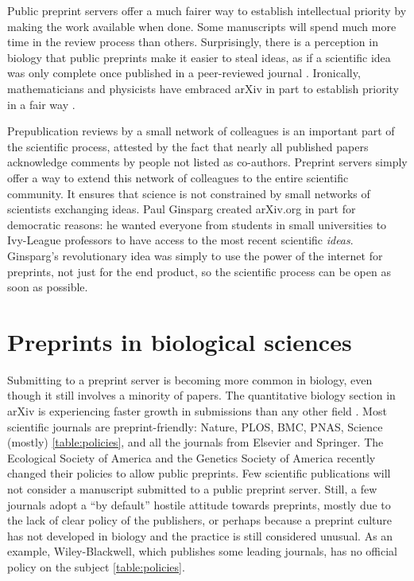 \documentclass[letterpaper,twocolumn,superscriptaddress,showkeys,longbibliography]{revtex4-1}
\begin{document}
Public preprint servers offer a much fairer way to establish intellectual
priority by making the work available when done. Some manuscripts will spend
much more time in the review process than others. Surprisingly, there is a
perception in biology that public preprints make it easier to steal ideas, as if
a scientific idea was only complete once published in a peer-reviewed journal
\cite{gin11}. Ironically, mathematicians and physicists have embraced arXiv in
part to establish priority in a fair way \cite{gin11,cal12}.

Prepublication reviews by a small network of colleagues is an important part of
the scientific process, attested by the fact that nearly all published papers
acknowledge comments by people not listed as co-authors.  Preprint servers
simply offer a way to extend this network of colleagues to the entire scientific
community. It ensures that science is not constrained by small networks of
scientists exchanging ideas.  Paul Ginsparg created arXiv.org in part for
democratic reasons: he wanted everyone from students in small universities to
Ivy-League professors to have access to the most recent scientific \emph{ideas}.
Ginsparg's revolutionary idea was simply to use the power of the internet for
preprints, not just for the end product, so the scientific process can be open
as soon as possible.

\section{Preprints in biological sciences}

Submitting to a preprint server is becoming more common in biology, even though
it still involves a minority of papers. The quantitative biology section in
arXiv is experiencing faster growth in submissions than any other field
\cite{cal12}. Most scientific journals are preprint-friendly: Nature, PLOS, BMC,
PNAS, Science (mostly) \ref{table:policies}, and all the journals from Elsevier %
and Springer.  The Ecological Society of America and the Genetics Society of
America recently changed their policies to allow public preprints.  Few
scientific publications will not consider a manuscript submitted to a public
preprint server.  Still, a few journals adopt a ``by default'' hostile attitude
towards preprints, mostly due to the lack of clear policy of the publishers, or
perhaps because a preprint culture has not developed in biology and the practice
is still considered unusual. As an example, Wiley-Blackwell, which publishes
some leading journals, has no official policy on the subject
\ref{table:policies}.
\end{document}

